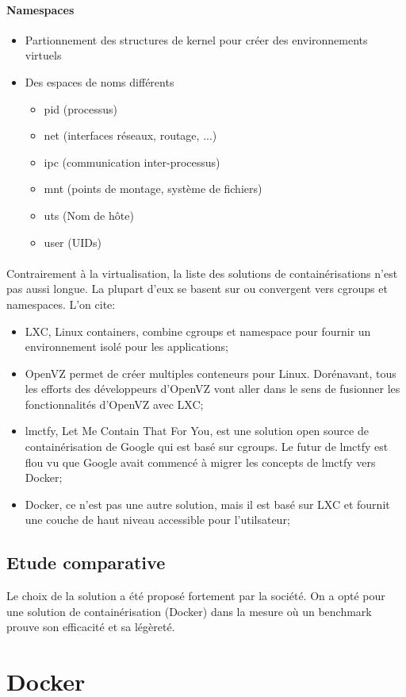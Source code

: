 \begin{onehalfspace}
\paragraph{Namespaces}
\begin{itemize}
\item Partionnement des structures de kernel pour créer des environnements virtuels
\item Des espaces de noms différents

\begin{itemize}
\item pid (processus)
\item net (interfaces réseaux, routage, ...)
\item ipc (communication inter-processus)
\item mnt (points de montage, système de fichiers)
\item uts (Nom de hôte)
\item user (UIDs)
\end{itemize}

\end{itemize}


\paragraph{}
Contrairement à la virtualisation, la liste des solutions de containérisations n'est pas aussi longue. La plupart d'eux se basent sur ou convergent vers cgroups et namespaces. L'on cite:

\begin{itemize}
\item LXC, Linux containers, combine cgroups et namespace pour fournir un environnement isolé pour les applications;
\item OpenVZ permet de créer multiples conteneurs pour Linux. Dorénavant, tous les efforts des développeurs d'OpenVZ vont aller dans le sens de fusionner les fonctionnalités d'OpenVZ avec LXC;
\item lmctfy, Let Me Contain That For You, est une solution open source de containérisation de Google qui est basé sur cgroups. Le futur de lmctfy est flou vu que Google avait commencé à migrer les concepts de lmctfy vers Docker;
\item Docker, ce n'est pas une autre solution, mais il est basé sur LXC et fournit une couche de haut niveau accessible pour l'utilsateur;

\end{itemize}

\subsection{Etude comparative}

Le choix de la solution a été proposé fortement par la société. On a opté pour une solution de containérisation (Docker) dans la mesure où un benchmark prouve son efficacité et sa légèreté.





\section{Docker}

\end{onehalfspace}
